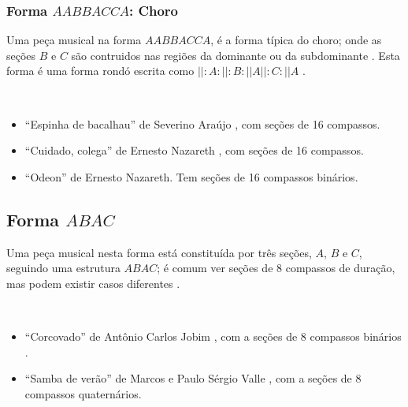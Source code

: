 \subsubsection{Forma $AABBACCA$: Choro}
\label{subsec:formachoro}
Uma peça musical na forma $AABBACCA$, é a forma típica do choro;
onde as seções $B$ e $C$ são contruidos nas regiões da dominante ou da subdominante 
\cite[pp. 83]{colluraimprovisacao}.
Esta forma é uma forma rondó escrita como  $||:A:||:B:||A||:C:||A$ \cite[pp. 53]{diniz2003almanaque}.
\begin{example} ~
\begin{itemize}
\item ``Espinha de bacalhau''  de Severino Araújo \cite[pp. 83]{colluraimprovisacao},
com seções de 16 compassos.
\item ``Cuidado, colega''  de Ernesto Nazareth \cite[pp. 83]{colluraimprovisacao},
com seções de 16 compassos.
\item ``Odeon'' de Ernesto Nazareth. Tem seções de 16 compassos binários.
\end{itemize}
\end{example}



\subsection{Forma $ABAC$}
\label{subsec:formaabac}
Uma peça musical nesta forma está constituída por três seções, $A$, $B$ e $C$,
seguindo uma estrutura $ABAC$; 
é comum ver seções de 8 compassos de duração, mas podem existir casos diferentes
\cite[pp. 53]{colluraimprovisacao}.
\begin{example} ~
\begin{itemize}
\item ``Corcovado''  de Antônio Carlos Jobim \cite[pp. 53]{colluraimprovisacao},
com a seções de 8 compassos binários \cite{partituracorcovado1}.
\item ``Samba de verão'' de Marcos e Paulo Sérgio Valle  \cite[pp. 53]{colluraimprovisacao},
com a seções de 8 compassos quaternários.
\end{itemize}
\end{example}


